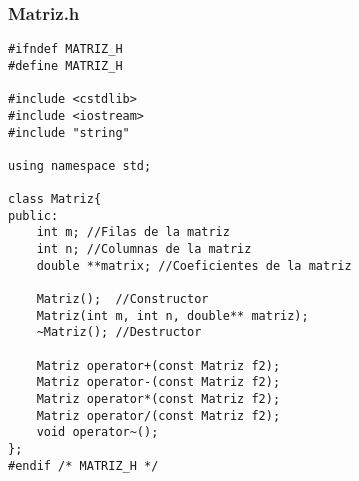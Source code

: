 \documentclass[11pt]{article}
\begin{document}
\subsubsection*{Matriz.h}
\begin{lstlisting}
#ifndef MATRIZ_H
#define MATRIZ_H

#include <cstdlib>
#include <iostream>
#include "string"

using namespace std;

class Matriz{
public:
	int m; //Filas de la matriz	
	int n; //Columnas de la matriz	
	double **matrix; //Coeficientes de la matriz
	
	Matriz();  //Constructor
	Matriz(int m, int n, double** matriz);
	~Matriz(); //Destructor
	
	Matriz operator+(const Matriz f2);
	Matriz operator-(const Matriz f2);
	Matriz operator*(const Matriz f2);
	Matriz operator/(const Matriz f2);
	void operator~();
};
#endif /* MATRIZ_H */
\end{lstlisting}
\vspace{2 em}
\end{document}
